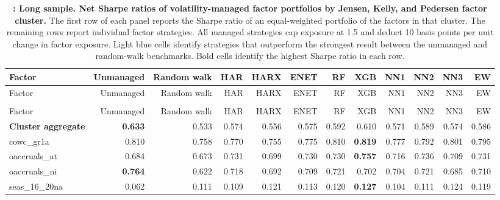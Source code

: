 \begin{landscape}
\begingroup\scriptsize
\captionsetup{justification=raggedright,labelsep=none,singlelinecheck=false,labelformat=boldlabel}
\setlength{\tabcolsep}{2.5pt}
\begin{longtable}{>{\raggedright\arraybackslash}p{2.6cm}rrrrrrrrrrr}
\caption[Net Sharpe ratios of volatility-managed factor portfolios by Jensen, Kelly, and Pedersen factor cluster.]{\footnotesize \textbf{: Long sample. Net Sharpe ratios of volatility-managed factor portfolios by Jensen, Kelly, and Pedersen factor cluster.} The first row of each panel reports the Sharpe ratio of an equal-weighted portfolio of the factors in that cluster. The remaining rows report individual factor strategies. All managed strategies cap exposure at 1.5 and deduct 10 basis points per unit change in factor exposure. Light blue cells identify strategies that outperform the strongest result between the unmanaged and random-walk benchmarks. Bold cells identify the highest Sharpe ratio in each row.}\label{tab:rv-portfolio_factor_sharpe}\\
\hline
Factor & Unmanaged & Random walk & HAR & HARX & ENET & RF & XGB & NN1 & NN2 & NN3 & EW \\
\hline\endfirsthead
\hline
Factor & Unmanaged & Random walk & HAR & HARX & ENET & RF & XGB & NN1 & NN2 & NN3 & EW \\
\hline\endhead
\hline\endfoot
\multicolumn{12}{@{}l}{\textit{Panel A. Accruals}} \\
\hline
Factor & Unmanaged & Random walk & HAR & HARX & ENET & RF & XGB & NN1 & NN2 & NN3 & EW \\
\hline
\textbf{Cluster aggregate} & \textbf{0.633} & 0.533 & 0.574 & 0.556 & 0.575 & 0.592 & 0.610 & 0.571 & 0.589 & 0.574 & 0.586 \\
cowc\_gr1a & 0.810 & 0.758 & 0.770 & 0.755 & 0.775 & 0.810 & \textbf{\cellcolor{blue!10}0.819} & 0.777 & 0.792 & 0.801 & 0.795 \\
oaccruals\_at & 0.684 & 0.673 & \cellcolor{blue!10}0.731 & \cellcolor{blue!10}0.699 & \cellcolor{blue!10}0.730 & \cellcolor{blue!10}0.730 & \textbf{\cellcolor{blue!10}0.757} & \cellcolor{blue!10}0.716 & \cellcolor{blue!10}0.736 & \cellcolor{blue!10}0.709 & \cellcolor{blue!10}0.731 \\
oaccruals\_ni & \textbf{0.764} & 0.622 & 0.718 & 0.692 & 0.709 & 0.721 & 0.702 & 0.704 & 0.721 & 0.685 & 0.710 \\
seas\_16\_20na & 0.062 & 0.111 & 0.109 & \cellcolor{blue!10}0.121 & \cellcolor{blue!10}0.113 & \cellcolor{blue!10}0.120 & \textbf{\cellcolor{blue!10}0.127} & 0.104 & \cellcolor{blue!10}0.111 & \cellcolor{blue!10}0.124 & \cellcolor{blue!10}0.119 \\

\end{longtable}
\end{landscape}
